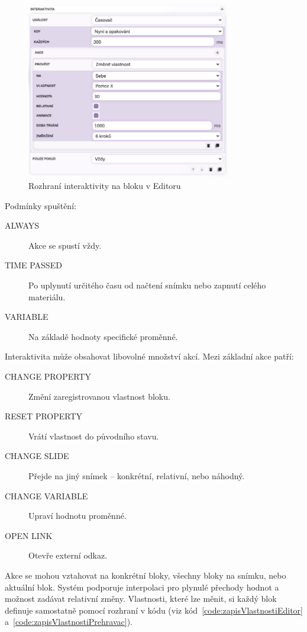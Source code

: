 \begin{figure}[ht!]
    \centering
    \includegraphics[width=0.8\textwidth]{media/05_realizace/interaktivita.png}
    \caption{Rozhraní interaktivity na bloku v Editoru}
    \label{fig:interaktivita}
\end{figure}


Podmínky spuštění:
\begin{description}
  \item[ALWAYS] Akce se spustí vždy.
  \item[TIME PASSED] Po uplynutí určitého času od načtení snímku nebo zapnutí celého materiálu.
  \item[VARIABLE] Na základě hodnoty specifické proměnné.
\end{description}

Interaktivita může obsahovat libovolné množství akcí. Mezi základní akce patří:

\begin{description}
  \item[CHANGE PROPERTY] Změní zaregistrovanou vlastnost bloku.
  \item[RESET PROPERTY] Vrátí vlastnost do původního stavu.
  \item[CHANGE SLIDE] Přejde na jiný snímek – konkrétní, relativní, nebo náhodný.
  \item[CHANGE VARIABLE] Upraví hodnotu proměnné.
  \item[OPEN LINK] Otevře externí odkaz.
\end{description}

Akce se mohou vztahovat na konkrétní bloky, všechny bloky na snímku, nebo aktuální blok. 
Systém podporuje interpolaci pro plynulé přechody hodnot a možnost zadávat relativní změny.
Vlastnosti, které lze měnit, si každý blok definuje samostatně pomocí rozhraní v kódu (viz kód~\ref{code:zapisVlastnostiEditor} a~\ref{code:zapisVlastnostiPrehravac}).

